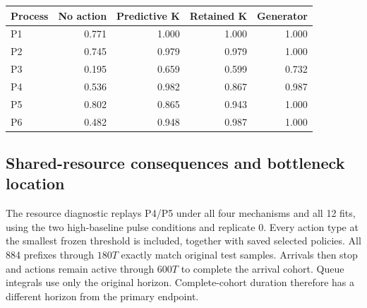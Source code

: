 \begin{center}\small\begin{tabular}{lrrrr}\toprule

Process & No action & Predictive K & Retained K & Generator\\\midrule

P1 & 0.771 & 1.000 & 1.000 & 1.000\\

P2 & 0.745 & 0.979 & 0.979 & 1.000\\

P3 & 0.195 & 0.659 & 0.599 & 0.732\\

P4 & 0.536 & 0.982 & 0.867 & 0.987\\

P5 & 0.802 & 0.865 & 0.943 & 1.000\\

P6 & 0.482 & 0.948 & 0.987 & 1.000\\

\bottomrule\end{tabular}\end{center}

\subsection{Shared-resource consequences and bottleneck location}

The resource diagnostic replays P4/P5 under all four mechanisms and all 12 fits, using the two high-baseline pulse conditions and replicate 0. Every action type at the smallest frozen threshold is included, together with saved selected policies. All 884 prefixes through $180T$ exactly match original test samples. Arrivals then stop and actions remain active through $600T$ to complete the arrival cohort. Queue integrals use only the original horizon. Complete-cohort duration therefore has a different horizon from the primary endpoint.

